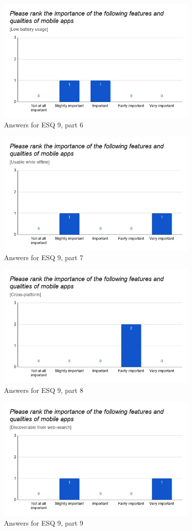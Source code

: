 \documentclass[a4paper,12pt]{article}
\begin{document}
\begin{figure}[ht!]
    \centering
    \includegraphics[width=10cm]{img/Results/esq9_6.png}
    \caption{Answers for ESQ 9, part 6}
    \label{fig:res_eduq9_6}
\end{figure}

\begin{figure}[ht!]
    \centering
    \includegraphics[width=10cm]{img/Results/esq9_7.png}
    \caption{Answers for ESQ 9, part 7}
    \label{fig:res_eduq9_7}
\end{figure}

\begin{figure}[ht!]
    \centering
    \includegraphics[width=10cm]{img/Results/esq9_8.png}
    \caption{Answers for ESQ 9, part 8}
    \label{fig:res_eduq9_8}
\end{figure}

\begin{figure}[ht!]
    \centering
    \includegraphics[width=10cm]{img/Results/esq9_9.png}
    \caption{Answers for ESQ 9, part 9}
    \label{fig:res_eduq9_9}
\end{figure}
\end{document}
